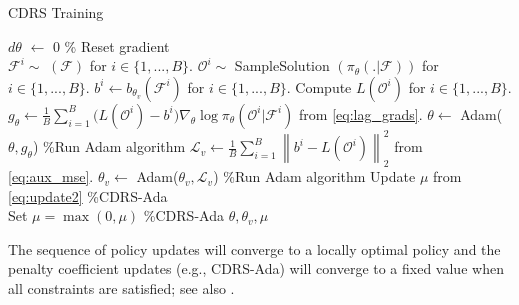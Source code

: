 %
%
\begin{algorithm}[t!]  \caption{CDRS Training}
	\label{algo:cdrs}
	\SetAlgoLined
	\DontPrintSemicolon
	{
		$d\theta$ $\leftarrow$ 0 \% Reset gradient \\
		$\mathcal{F}^i \sim $  $(\mathcal{F})$ for $i \in \{1,...,B \}$. \;
		$\mathcal{O}^i \sim $ SampleSolution $(\pi_\theta(.|\mathcal{F}))$ for $i \in \{1,...,B \}$. \;
		$b^i \leftarrow b_{\theta_v} (\mathcal{F}^i)$ for $i \in \{1,...,B \}$. \;
		Compute $L(\mathcal{O}^i)$ for $i \in \{1,...,B \}$. \;
		$g_\theta \leftarrow \frac{1}{B} \! \sum_{i=1}^{B} \! \! \Big(\! L(\mathcal{O}^i) \! - \! b^{i}\! \Big) \! \nabla_{\!\theta} \! \log \! \pi_\theta(\mathcal{O}^i | \mathcal{F}^i)$ from \eqref{eq:lag_grads}. \;
		$\theta \leftarrow$ Adam($\theta, g_\theta$) \%Run Adam algorithm \;
		$\mathcal{L}_v \leftarrow \frac{1}{B} \sum_{i=1}^{B} \left\| b^{i} - L(\mathcal{O}^i) \right\|_2^2 $ from \eqref{eq:aux_mse}. \;
		$\theta_v \leftarrow$ Adam($\theta_v, \mathcal{L}_v$) \%Run Adam algorithm \;
		{\color{black} Update ${\mu}$ from \eqref{eq:update2} \%CDRS-Ada\\ }
		{\color{black} Set ${\mu} = \max(0,{\mu})$ \%CDRS-Ada}
	}
	\Return $\theta, \theta_v, \mu$
	\;
\end{algorithm}
%
%

The sequence of policy updates will converge to a locally optimal policy and the penalty coefficient updates (e.g., CDRS-Ada) will converge to a fixed value when all constraints are satisfied; see also \cite{pdo_risk,reward_constraint}. 


%



